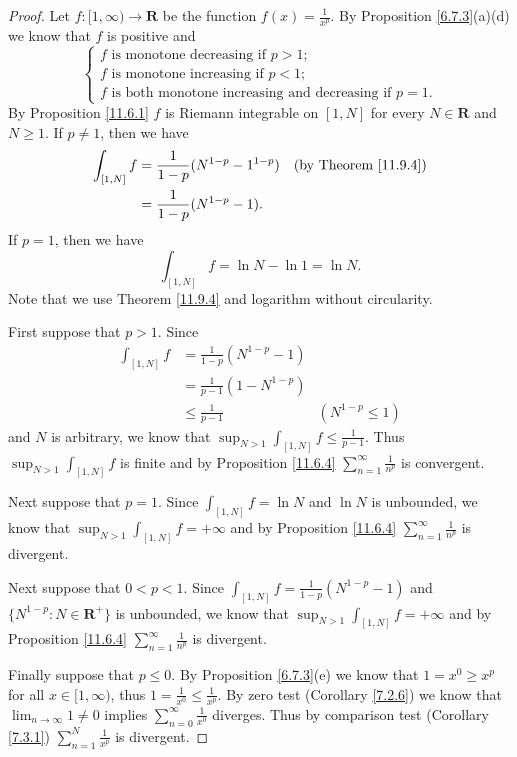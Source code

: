 \begin{proof}
    Let \(f : [1, \infty) \to \mathbf{R}\) be the function \(f(x) = \frac{1}{x^p}\).
    By Proposition \ref{6.7.3}(a)(d) we know that \(f\) is positive and
    \[
        \begin{cases}
            f \text{ is monotone decreasing if } p > 1; \\
            f \text{ is monotone increasing if } p < 1; \\
            f \text{ is both monotone increasing and decreasing if } p = 1.
        \end{cases}
    \]
    By Proposition \ref{11.6.1} \(f\) is Riemann integrable on \([1, N]\) for every \(N \in \mathbf{R}\) and \(N \geq 1\).
    If \(p \neq 1\), then we have
    \begin{align*}
        \int_{[1, N]} f & = \frac{1}{1 - p} (N^{1 - p} - 1^{1 - p}) & \text{(by Theorem \ref{11.9.4})} \\
                        & = \frac{1}{1 - p} (N^{1 - p} - 1).
    \end{align*}
    If \(p = 1\), then we have
    \[
        \int_{[1, N]} f = \ln N - \ln 1 = \ln N.
    \]
    Note that we use Theorem \ref{11.9.4} and logarithm without circularity.

    First suppose that \(p > 1\).
    Since
    \begin{align*}
        \int_{[1, N]} f & = \frac{1}{1 - p} (N^{1 - p} - 1)                      \\
                        & = \frac{1}{p - 1} (1 - N^{1 - p})                      \\
                        & \leq \frac{1}{p - 1}              & (N^{1 - p} \leq 1)
    \end{align*}
    and \(N\) is arbitrary, we know that \(\sup_{N > 1} \int_{[1, N]} f \leq \frac{1}{p - 1}\).
    Thus \(\sup_{N > 1} \int_{[1, N]} f\) is finite and by Proposition \ref{11.6.4} \(\sum_{n = 1}^\infty \frac{1}{n^p}\) is convergent.

    Next suppose that \(p = 1\).
    Since \(\int_{[1, N]} f = \ln N\) and \(\ln N\) is unbounded, we know that \(\sup_{N > 1} \int_{[1, N]} f = +\infty\) and by Proposition \ref{11.6.4} \(\sum_{n = 1}^\infty \frac{1}{n^p}\) is divergent.

    Next suppose that \(0 < p < 1\).
    Since \(\int_{[1, N]} f = \frac{1}{1 - p} (N^{1 - p} - 1)\) and \(\{N^{1 - p} : N \in \mathbf{R}^+\}\) is unbounded, we know that \(\sup_{N > 1} \int_{[1, N]} f = +\infty\) and by Proposition \ref{11.6.4} \(\sum_{n = 1}^\infty \frac{1}{n^p}\) is divergent.

    Finally suppose that \(p \leq 0\).
    By Proposition \ref{6.7.3}(e) we know that \(1 = x^0 \geq x^p\) for all \(x \in [1, \infty)\), thus \(1 = \frac{1}{x^0} \leq \frac{1}{x^p}\).
    By zero test (Corollary \ref{7.2.6}) we know that \(\lim_{n \to \infty} 1 \neq 0\) implies \(\sum_{n = 0}^\infty \frac{1}{x^0}\) diverges.
    Thus by comparison test (Corollary \ref{7.3.1}) \(\sum_{n = 1}^N \frac{1}{x^p}\) is divergent.
\end{proof}

